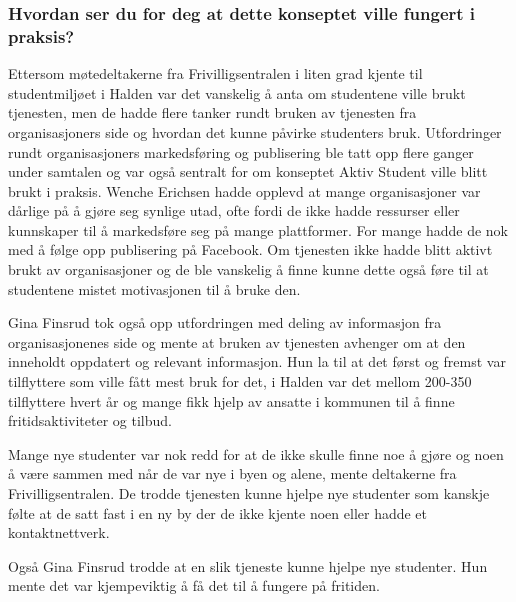 \subsubsection{Hvordan ser du for deg at dette konseptet ville fungert i praksis?}

\setlength{\leftskip}{2em}
Ettersom møtedeltakerne fra Frivilligsentralen i liten grad kjente til studentmiljøet i Halden var det vanskelig å anta om studentene ville brukt tjenesten, men de hadde flere tanker rundt bruken av tjenesten fra organisasjoners side og hvordan det kunne påvirke studenters bruk. Utfordringer rundt organisasjoners markedsføring og publisering ble tatt opp flere ganger under samtalen og var også sentralt for om konseptet Aktiv Student ville blitt brukt i praksis. Wenche Erichsen hadde opplevd at mange organisasjoner var dårlige på å gjøre seg synlige utad, ofte fordi de ikke hadde ressurser eller kunnskaper til å markedsføre seg på mange plattformer. For mange hadde de nok med å følge opp publisering på Facebook. Om tjenesten ikke hadde blitt aktivt brukt av organisasjoner og de ble vanskelig å finne kunne dette også føre til at studentene mistet motivasjonen til å bruke den. \cite{FRIVILLIGSENTRALEN-INTERVJU:21}

Gina Finsrud tok også opp utfordringen med deling av informasjon fra organisasjonenes side og mente at bruken av tjenesten avhenger om at den inneholdt oppdatert og relevant informasjon. Hun la til at det først og fremst var tilflyttere som ville fått mest bruk for det, i Halden var det mellom 200-350 tilflyttere hvert år og mange fikk hjelp av ansatte i kommunen til å finne fritidsaktiviteter og tilbud. \cite{KOMMUNEN-INTERVJU:20}

Mange nye studenter var nok redd for at de ikke skulle finne noe å gjøre og noen å være sammen med når de var nye i byen og alene, mente deltakerne fra Frivilligsentralen. De trodde tjenesten kunne hjelpe nye studenter som kanskje følte at de satt fast i en ny by der de ikke kjente noen eller hadde et kontaktnettverk. \cite{FRIVILLIGSENTRALEN-INTERVJU:21}

Også Gina Finsrud trodde at en slik tjeneste kunne hjelpe nye studenter. Hun mente det var kjempeviktig å få det til å fungere på fritiden. \cite{KOMMUNEN-INTERVJU:20}


